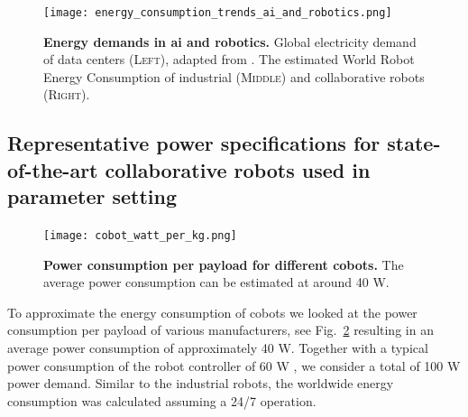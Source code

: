 \begin{figure}[h!]
	\centering
	\hspace*{\fill}
	\texttt{[image: energy\_consumption\_trends\_ai\_and\_robotics.png]}
	\hspace*{\fill}
	\caption[] {\label{fig:energy_consumption_trends_ai_and_robotics} \textbf{Energy demands in \ac{ai} and robotics.} Global electricity demand of data centers (\textsc{Left}), adapted from \cite{andrae2015global}. The estimated World Robot Energy Consumption of industrial (\textsc{Middle}) and collaborative robots (\textsc{Right}).}
\end{figure}

\subsection{ Representative power specifications for state-of-the-art collaborative robots used in parameter setting}\label{sec:app_cobot_ener_consumption}
\begin{figure}[!h]
	\centering
	\texttt{[image: cobot\_watt\_per\_kg.png]}
	\caption{\textbf{Power consumption per payload for different cobots.} The average power consumption can be estimated at around 40 W.}
	\label{fig:cobot_watt_per_kg}
\end{figure}
To approximate the energy consumption of cobots we looked at the power consumption per payload of various manufacturers, see Fig.~\ref{fig:cobot_watt_per_kg} resulting in an average power consumption of approximately 40 W. Together with a typical power consumption of the robot controller of 60 W \cite{Heredia2023BreakingEnergyConsumption}, we consider a total of 100 W power demand. Similar to the industrial robots, the worldwide energy consumption was calculated assuming a 24/7 operation.



